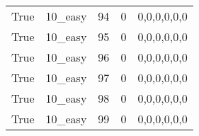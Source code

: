 \begin{tabular}{llrrl}
 True            & 10\_easy             &            94 &                     0 & 0,0,0,0,0,0   \\
 True            & 10\_easy             &            95 &                     0 & 0,0,0,0,0,0   \\
 True            & 10\_easy             &            96 &                     0 & 0,0,0,0,0,0   \\
 True            & 10\_easy             &            97 &                     0 & 0,0,0,0,0,0   \\
 True            & 10\_easy             &            98 &                     0 & 0,0,0,0,0,0   \\
 True            & 10\_easy             &            99 &                     0 & 0,0,0,0,0,0   \\
\hline
\end{tabular}